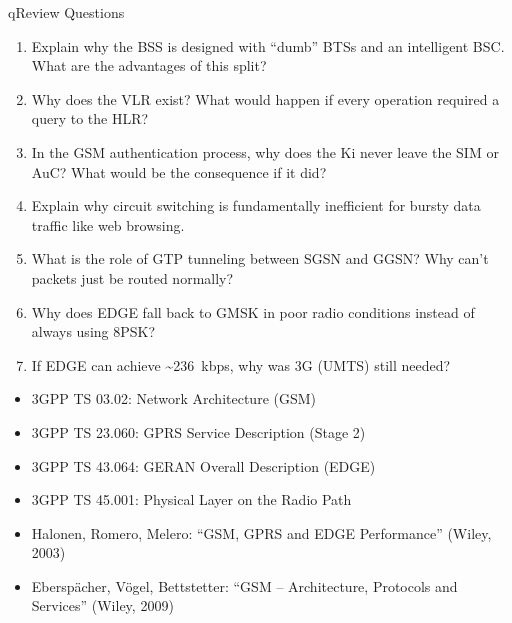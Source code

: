 \begin{CNbox}[unbreakable]{q}{Review Questions}

\begin{enumerate}
\def\labelenumi{\arabic{enumi}.}
\tightlist
\item
  Explain why the BSS is designed with ``dumb'' BTSs and an intelligent BSC. What are the advantages of this split?
\item
  Why does the VLR exist? What would happen if every operation required a query to the HLR?
\item
  In the GSM authentication process, why does the Ki never leave the SIM or AuC? What would be the consequence if it did?
\item
  Explain why circuit switching is fundamentally inefficient for bursty data traffic like web browsing.
\item
  What is the role of GTP tunneling between SGSN and GGSN? Why can’t packets just be routed normally?
\item
  Why does EDGE fall back to GMSK in poor radio conditions instead of always using 8PSK?
\item
  If EDGE can achieve \textasciitilde{}236~kbps, why was 3G (UMTS) still needed?
\end{enumerate}

\end{CNbox}


\begin{itemize}
\tightlist
\item
  3GPP TS 03.02: Network Architecture (GSM)
\item
  3GPP TS 23.060: GPRS Service Description (Stage 2)
\item
  3GPP TS 43.064: GERAN Overall Description (EDGE)
\item
  3GPP TS 45.001: Physical Layer on the Radio Path
\item
  Halonen, Romero, Melero: ``GSM, GPRS and EDGE Performance'' (Wiley, 2003)
\item
  Eberspächer, Vögel, Bettstetter: ``GSM – Architecture, Protocols and Services'' (Wiley, 2009)
\end{itemize}
